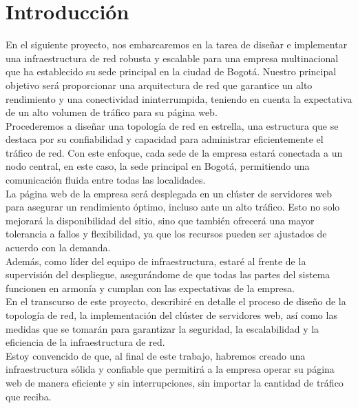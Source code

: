 \section{Introducción}

En el siguiente proyecto, nos embarcaremos en la tarea de diseñar e implementar
una infraestructura de red robusta y escalable para una empresa multinacional
que ha establecido su sede principal en la ciudad de Bogotá. Nuestro principal
objetivo será proporcionar una arquitectura de red que garantice un alto
rendimiento y una conectividad ininterrumpida, teniendo en cuenta la
expectativa de un alto volumen de tráfico para su página web.
\\

Procederemos a diseñar una topología de red en estrella, una estructura que se
destaca por su confiabilidad y capacidad para administrar eficientemente el
tráfico de red. Con este enfoque, cada sede de la empresa estará conectada a un
nodo central, en este caso, la sede principal en Bogotá, permitiendo una
comunicación fluida entre todas las localidades.
\\

La página web de la empresa será desplegada en un clúster de servidores web
para asegurar un rendimiento óptimo, incluso ante un alto tráfico. Esto no
solo mejorará la disponibilidad del sitio, sino que también ofrecerá una mayor
tolerancia a fallos y flexibilidad, ya que los recursos pueden ser ajustados de
acuerdo con la demanda.
\\

Además, como líder del equipo de infraestructura, estaré al frente de la
supervisión del despliegue, asegurándome de que todas las partes del sistema
funcionen en armonía y cumplan con las expectativas de la empresa.
\\

En el transcurso de este proyecto, describiré en detalle el proceso de diseño
de la topología de red, la implementación del clúster de servidores web, así
como las medidas que se tomarán para garantizar la seguridad, la escalabilidad
y la eficiencia de la infraestructura de red.
\\

Estoy convencido de que, al final de este trabajo, habremos creado una
infraestructura sólida y confiable que permitirá a la empresa operar su página
web de manera eficiente y sin interrupciones, sin importar la cantidad de
tráfico que reciba.
